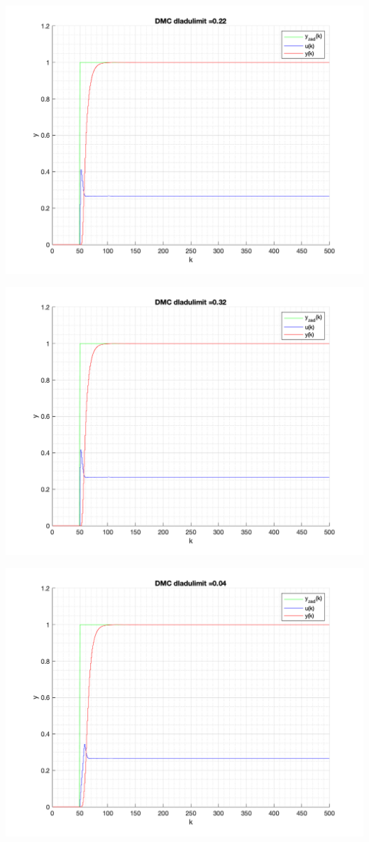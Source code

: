 \documentclass[a4paper, 11pt]{article}
\begin{document}
\begin{enumerate}
 \includegraphics[width=\linewidth]{./ModelsP6_dulimit/P4_DMC_dulimit_0_22_png.png} 
 
 \includegraphics[width=\linewidth]{./ModelsP6_dulimit/P4_DMC_dulimit_0_32_png.png} 
 
 \includegraphics[width=\linewidth]{./ModelsP6_dulimit/P4_DMC_dulimit_0_04_png.png} 
 

\end{enumerate}
\end{document}
